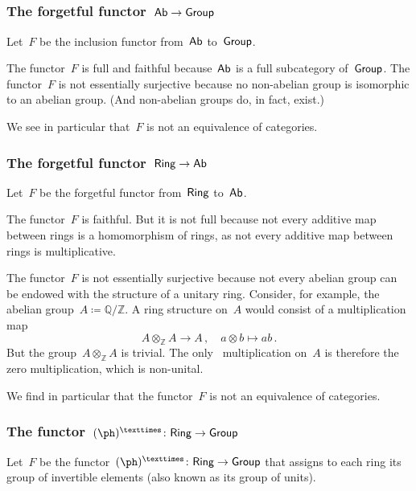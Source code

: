 \subsection{}



\subsubsection*{The forgetful functor~$\mathsf{Ab} \to \mathsf{Group}$}

Let~$F$ be the inclusion functor from~$\mathsf{Ab}$ to~$\mathsf{Group}$.

The functor~$F$ is full and faithful because~$\mathsf{Ab}$ is a full subcategory of~$\mathsf{Group}$.
The functor~$F$ is not essentially surjective because no non-abelian group is isomorphic to an abelian group.
(And non-abelian groups do, in fact, exist.)

We see in particular that~$F$ is not an equivalence of categories.



\subsubsection*{The forgetful functor~$\mathsf{Ring} \to \mathsf{Ab}$}

Let~$F$ be the forgetful functor from~$\mathsf{Ring}$ to~$\mathsf{Ab}$.

The functor~$F$ is faithful.
But it is not full because not every additive map between rings is a homomorphism of rings, as not every additive map between rings is multiplicative.

The functor~$F$ is not essentially surjective because not every abelian group can be endowed with the structure of a unitary ring.
Consider, for example, the abelian group~$A ≔ ℚ / ℤ$.
A ring structure on~$A$ would consist of a multiplication map
\[
	A ⊗_ℤ A \to A \,,
	\quad
	a ⊗ b \mapsto ab \,.
\]
But the group~$A ⊗_ℤ A$ is trivial.
The only~ multiplication on~$A$ is therefore the zero multiplication, which is non-unital.

We find in particular that the functor~$F$ is not an equivalence of categories.



\subsubsection*{The functor~$(\ph)^× \colon \Ring \to \Group$}

Let~$F$ be the functor~$(\ph)^× \colon \Ring \to \Group$ that assigns to each ring its group of invertible elements (also known as its group of units).

